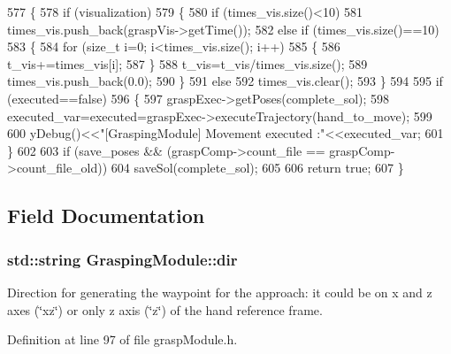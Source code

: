 \begin{DoxyCode}
577 \{
578     \textcolor{keywordflow}{if} (visualization)
579     \{
580         \textcolor{keywordflow}{if} (times\_vis.size()<10)
581             times\_vis.push\_back(graspVis->getTime());
582         \textcolor{keywordflow}{else} \textcolor{keywordflow}{if} (times\_vis.size()==10)
583         \{
584             \textcolor{keywordflow}{for} (\textcolor{keywordtype}{size\_t} i=0; i<times\_vis.size(); i++)
585             \{
586                 t\_vis+=times\_vis[i];
587             \}
588             t\_vis=t\_vis/times\_vis.size();
589             times\_vis.push\_back(0.0);
590         \}
591         \textcolor{keywordflow}{else}
592             times\_vis.clear();
593     \}
594 
595     \textcolor{keywordflow}{if} (executed==\textcolor{keyword}{false})
596     \{
597         graspExec->getPoses(complete_sol);
598         executed_var=executed=graspExec->executeTrajectory(hand_to_move);
599 
600         yDebug()<<\textcolor{stringliteral}{"[GraspingModule] Movement executed :"}<<executed_var;
601     \}
602 
603     \textcolor{keywordflow}{if} (save_poses && (graspComp->count\_file == graspComp->count\_file\_old))
604         saveSol(complete_sol);
605 
606    \textcolor{keywordflow}{return} \textcolor{keyword}{true};
607 \}
\end{DoxyCode}


\subsection{Field Documentation}
\subsubsection[{\texorpdfstring{dir}{dir}}]{\setlength{\rightskip}{0pt plus 5cm}std\+::string Grasping\+Module\+::dir\hspace{0.3cm}{\ttfamily [protected]}}\label{classGraspingModule_a87c885eada6df4d622c92173d8a4ed2e}


Direction for generating the waypoint for the approach\+: it could be on x and z axes (\char`\"{}xz\char`\"{}) or only z axis (\char`\"{}z\char`\"{}) of the hand reference frame. 



Definition at line 97 of file grasp\+Module.\+h.

